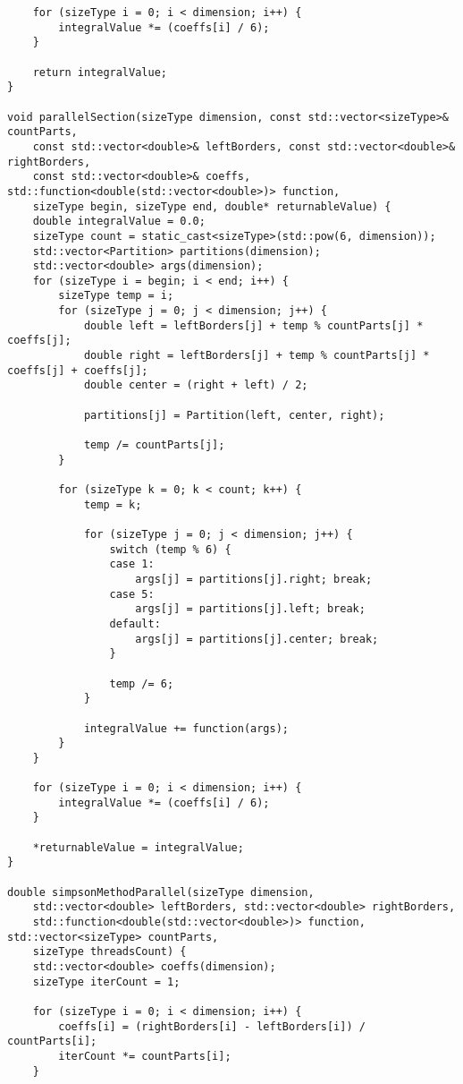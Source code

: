 \documentclass{report}
\begin{document}
\begin{lstlisting}
    for (sizeType i = 0; i < dimension; i++) {
        integralValue *= (coeffs[i] / 6);
    }

    return integralValue;
}

void parallelSection(sizeType dimension, const std::vector<sizeType>& countParts,
    const std::vector<double>& leftBorders, const std::vector<double>& rightBorders,
    const std::vector<double>& coeffs, std::function<double(std::vector<double>)> function,
    sizeType begin, sizeType end, double* returnableValue) {
    double integralValue = 0.0;
    sizeType count = static_cast<sizeType>(std::pow(6, dimension));
    std::vector<Partition> partitions(dimension);
    std::vector<double> args(dimension);
    for (sizeType i = begin; i < end; i++) {
        sizeType temp = i;
        for (sizeType j = 0; j < dimension; j++) {
            double left = leftBorders[j] + temp % countParts[j] * coeffs[j];
            double right = leftBorders[j] + temp % countParts[j] * coeffs[j] + coeffs[j];
            double center = (right + left) / 2;

            partitions[j] = Partition(left, center, right);

            temp /= countParts[j];
        }

        for (sizeType k = 0; k < count; k++) {
            temp = k;

            for (sizeType j = 0; j < dimension; j++) {
                switch (temp % 6) {
                case 1:
                    args[j] = partitions[j].right; break;
                case 5:
                    args[j] = partitions[j].left; break;
                default:
                    args[j] = partitions[j].center; break;
                }

                temp /= 6;
            }

            integralValue += function(args);
        }
    }

    for (sizeType i = 0; i < dimension; i++) {
        integralValue *= (coeffs[i] / 6);
    }

    *returnableValue = integralValue;
}

double simpsonMethodParallel(sizeType dimension,
    std::vector<double> leftBorders, std::vector<double> rightBorders,
    std::function<double(std::vector<double>)> function, std::vector<sizeType> countParts,
    sizeType threadsCount) {
    std::vector<double> coeffs(dimension);
    sizeType iterCount = 1;

    for (sizeType i = 0; i < dimension; i++) {
        coeffs[i] = (rightBorders[i] - leftBorders[i]) / countParts[i];
        iterCount *= countParts[i];
    }


\end{lstlisting}
\end{document}
